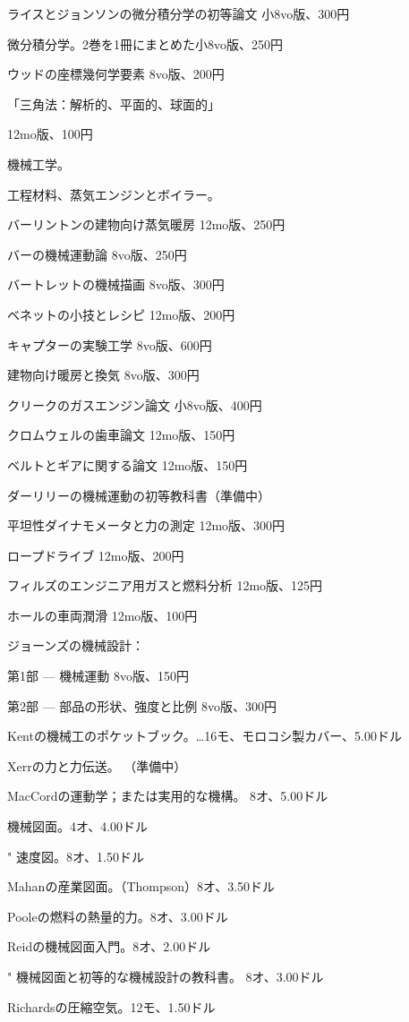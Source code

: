 \documentclass[a4paper,11pt,openany]{ltjsbook}
\begin{document}
ライスとジョンソンの微分積分学の初等論文 小8vo版、300円

微分積分学。2巻を1冊にまとめた小8vo版、250円

ウッドの座標幾何学要素 8vo版、200円

「三角法：解析的、平面的、球面的」

12mo版、100円

機械工学。

工程材料、蒸気エンジンとボイラー。

バーリントンの建物向け蒸気暖房 12mo版、250円

バーの機械運動論 8vo版、250円

バートレットの機械描画 8vo版、300円

ベネットの小技とレシピ 12mo版、200円

キャプターの実験工学 8vo版、600円

建物向け暖房と換気 8vo版、300円

クリークのガスエンジン論文 小8vo版、400円

クロムウェルの歯車論文 12mo版、150円

ベルトとギアに関する論文 12mo版、150円

ダーリリーの機械運動の初等教科書（準備中）

平坦性ダイナモメータと力の測定 12mo版、300円

ロープドライブ 12mo版、200円

フィルズのエンジニア用ガスと燃料分析 12mo版、125円

ホールの車両潤滑 12mo版、100円

ジョーンズの機械設計：

第1部 — 機械運動 8vo版、150円

第2部 — 部品の形状、強度と比例 8vo版、300円

Kentの機械工のポケットブック。…16モ、モロコシ製カバー、5.00ドル

Xerrの力と力伝送。 （準備中）

MacCordの運動学；または実用的な機構。 8オ、5.00ドル

機械図面。4オ、4.00ドル

"          速度図。8オ、1.50ドル

Mahanの産業図面。（Thompson）8オ、3.50ドル

Pooleの燃料の熱量的力。8オ、3.00ドル

Reidの機械図面入門。8オ、2.00ドル

"      機械図面と初等的な機械設計の教科書。     8オ、3.00ドル

Richardsの圧縮空気。12モ、1.50ドル
\end{document}
